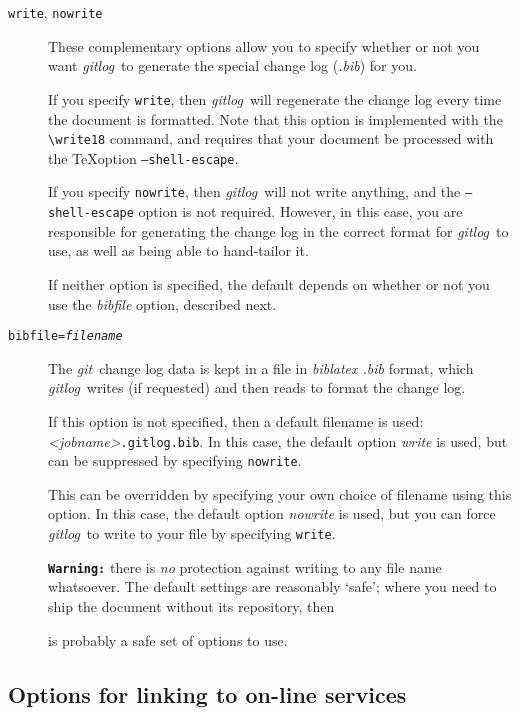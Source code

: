\documentclass[a4paper,12pt,twoside,openany]{memoir}
\newcommand{\tcmd}[1]{\texttt{\textbackslash#1}}
\newcommand{\dark}[1]{\texttt\textbf{{#1}}}
\newcommand{\sfit}[1]{\textit{#1}}
\newcommand{\git}{\sfit{git}}
\newcommand{\tpname}{\sfit{gitlog}}
\begin{document}
\begin{description}

\item[\texttt{write}, \texttt{nowrite}]
These complementary options
allow you to specify whether or not you want 
\tpname\ to generate the special change log (\sfit{.bib}) 
for you.

If you specify \texttt{write}, then \tpname\ will regenerate the 
change log every time the document is formatted. 
Note that this option is implemented with the \tcmd{write18} command,
and requires that your document be processed with the \TeX option 
\texttt{--shell-escape}.

If you specify \texttt{nowrite}, then \tpname\ will not write anything,
and the \texttt{--shell-escape} option is not required.
However, in this case, 
you are responsible for generating the change log 
in the correct format for \tpname\ to use, 
as well as being able to hand-tailor it.

If neither option is specified, the default depends on whether or not
you use the \sfit{bibfile} option, described next.  

\clearpage
\item[\texttt{bibfile=\textit{filename}}]
The \git\ change log data is kept in 
a file in \sfit{biblatex .bib} format, 
which \tpname\ writes (if requested) and then reads 
to format the change log.

If this option is not specified, then a default filename
is used:
\textit{<jobname>}\texttt{.gitlog.bib}. 
In this case, the default option \sfit{write} is used,
but can be suppressed by specifying \texttt{nowrite}.

This can be overridden by specifying your own choice
of filename using this option.
In this case, the default option \sfit{nowrite} is used,
but you can force \tpname\ to write to your file 
by specifying \texttt{write}.

\dark{Warning:} there is \emph{no} protection against writing
to any file name whatsoever. 
The default settings are reasonably `safe'; 
where you need to ship the document without its repository,
then  
\begin{quote}
{\ttfamily
[write,bibfile=\jobname.local.bib]
}
\end{quote}
is probably a safe set of options to use.

\end{description}

\subsection{Options for linking to on-line services}
\end{document}
